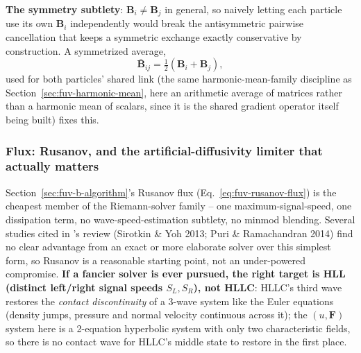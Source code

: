\textbf{The symmetry subtlety}: $\mathbf B_i\ne\mathbf B_j$ in general,
so naively letting each particle use its own $\mathbf B_i$
independently would break the antisymmetric pairwise cancellation that
keeps a symmetric exchange exactly conservative by construction. A
symmetrized average,
\begin{equation}
  \bar{\mathbf B}_{ij} = \tfrac12\left(\mathbf B_i + \mathbf B_j\right) ,
  \label{eq:fuv-tier15-bavg}
\end{equation}
used for both particles' shared link (the same harmonic-mean-family
discipline as Section~\ref{sec:fuv-harmonic-mean}, here an arithmetic
average of matrices rather than a harmonic mean of scalars, since it is
the shared gradient operator itself being built) fixes this.

\subsubsection{Flux: Rusanov, and the artificial-diffusivity limiter
that actually matters}
\label{sec:fuv-b-rusanov}

Section~\ref{sec:fuv-b-algorithm}'s Rusanov flux (Eq.~\ref{eq:fuv-rusanov-flux})
is the cheapest member of the Riemann-solver family -- one
maximum-signal-speed, one dissipation term, no wave-speed-estimation
subtlety, no minmod blending. Several studies cited in
\citet{Rosswog2026}'s review (Sirotkin \& Yoh 2013; Puri \&
Ramachandran 2014) find no clear advantage from an exact or more
elaborate solver over this simplest form, so Rusanov is a reasonable
starting point, not an under-powered compromise. \textbf{If a fancier
solver is ever pursued, the right target is HLL (distinct left/right
signal speeds $S_L,S_R$), not HLLC}: HLLC's third wave restores the
\emph{contact discontinuity} of a 3-wave system like the Euler
equations (density jumps, pressure and normal velocity continuous
across it); the $(u,\mathbf F)$ system here is a 2-equation hyperbolic
system with only two characteristic fields, so there is no contact
wave for HLLC's middle state to restore in the first place.

